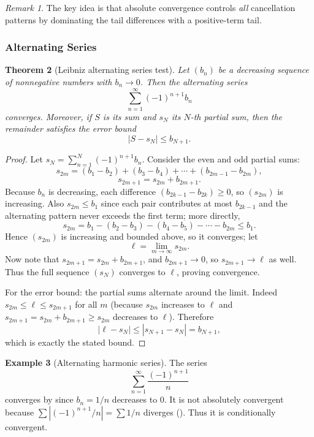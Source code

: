 \documentclass[12pt]{article}
\numberwithin{equation}{section}
\def\abs#1{|#1|}
\DeclarePairedDelimiter{\abs}{\lvert}{\rvert}
\theoremstyle{plain}
\newtheorem{theorem}{Theorem}[section]
\theoremstyle{definition}
\newtheorem{example}[theorem]{Example}
\theoremstyle{remark}
\newtheorem{remark}[theorem]{Remark}
\begin{document}
\begin{remark}
The key idea is that absolute convergence controls \emph{all} cancellation patterns by dominating the tail differences with a positive-term tail.
\end{remark}

\subsubsection{Alternating Series}

\begin{theorem}[Leibniz alternating series test]\label{thm:alternating}
Let $(b_n)$ be a decreasing sequence of nonnegative numbers with $b_n\to 0$.
Then the alternating series
\[
\sum_{n=1}^{\infty} (-1)^{n+1} b_n
\]
converges.
Moreover, if $S$ is its sum and $s_N$ its $N$-th partial sum, then the remainder satisfies the error bound
\[
\abs{S-s_N}\le b_{N+1}.
\]
\end{theorem}

\begin{proof}
Let $s_N=\sum_{n=1}^{N}(-1)^{n+1}b_n$.
Consider the even and odd partial sums:
\[
s_{2m} = (b_1-b_2)+(b_3-b_4)+\cdots+(b_{2m-1}-b_{2m}),
\]
\[
s_{2m+1}=s_{2m}+b_{2m+1}.
\]
Because $b_n$ is decreasing, each difference $(b_{2k-1}-b_{2k})\ge 0$, so $(s_{2m})$ is increasing.
Also $s_{2m}\le b_1$ since each pair contributes at most $b_{2k-1}$ and the alternating pattern never exceeds the first term; more directly,
\[
s_{2m} = b_1 - (b_2-b_3) - (b_4-b_5)-\cdots - b_{2m}\le b_1.
\]
Hence $(s_{2m})$ is increasing and bounded above, so it converges; let
\[
\ell=\lim_{m\to\infty} s_{2m}.
\]
Now note that $s_{2m+1}=s_{2m}+b_{2m+1}$, and $b_{2m+1}\to 0$, so $s_{2m+1}\to \ell$ as well.
Thus the full sequence $(s_N)$ converges to $\ell$, proving convergence.

For the error bound: the partial sums alternate around the limit.
Indeed $s_{2m}\le \ell \le s_{2m+1}$ for all $m$ (because $s_{2m}$ increases to $\ell$ and $s_{2m+1}=s_{2m}+b_{2m+1}\ge s_{2m}$ decreases to $\ell$).
Therefore
\[
\abs{\ell-s_N}\le \abs{s_{N+1}-s_N}=b_{N+1},
\]
which is exactly the stated bound.
\end{proof}

\begin{example}[Alternating harmonic series]\label{ex:alt-harmonic}
The series
\[
\sum_{n=1}^{\infty}\frac{(-1)^{n+1}}{n}
\]
converges by  since $b_n=1/n$ decreases to $0$.
It is not absolutely convergent because $\sum \abs{(-1)^{n+1}/n}=\sum 1/n$ diverges ().
Thus it is conditionally convergent.
\end{example}
\end{document}
